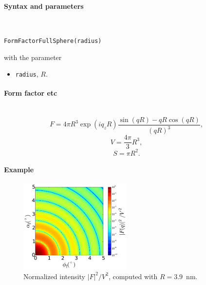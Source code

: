 \FloatBarrier

\paragraph{Syntax and parameters}\strut\\[-2ex plus .2ex minus .2ex]
\begin{lstlisting}[language=python, style=eclipseboxed,numbers=none,nolol]
  FormFactorFullSphere(radius)
\end{lstlisting}
with the parameter
\begin{itemize}
\item \texttt{radius}, $R$.
\end{itemize}


\paragraph{Form factor etc}\strut\\
\begin{equation*}
F = 4\pi R^3 \exp(iq_z R)\frac{\sin(q R) - q R \cos(q R)}{(qR)^3},
\end{equation*}
\begin{equation*}
  V = \dfrac{4\pi}{3}R^3,
\end{equation*}
\begin{equation*}
  S= \pi R^2.
\end{equation*}

\paragraph{Example}\nopagebreak\strut\nopagebreak

\begin{figure}[H]
\begin{center}
\includegraphics[width=0.5\textwidth]{fig/ff2/ff_FullSphere.pdf}
\end{center}
\caption{Normalized intensity $|F|^2/V^2$,
computed with $R=3.9$~nm.}
\end{figure}

